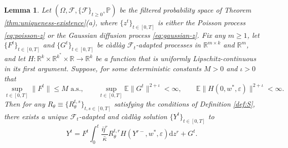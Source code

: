 \documentclass[11pt,letterpaper,reqno]{amsart}
\newtheorem{lem}[thm]{Lemma}
\theoremstyle{definition}
\def\eps{\varepsilon}
\def\d{\mathrm{d}}
\def\P{\mathbb{P}}
\def\E{\mathbb{E}}
\def\R{\mathbb{R}}
\def\cF{\mathcal{F}}
\def\Rt{R_\theta}
\newcommand{\norm}[1]{\|#1\|}
\begin{document}
\begin{lem}\label{lem:exist-unique-poisson-volterra}
Let $(\Omega,\cF,\{\cF\}_{t \geq 0},\P)$ be the filtered probability space
of Theorem \ref{thm:uniqueness-existence}(a), where
$\{z^t\}_{t \in [0,T]}$ is either the Poisson process
\eqref{eq:poisson-z} or the Gaussian diffusion process \eqref{eq:gaussian-z}.
Fix any $m \geq 1$, let $\{F^t\}_{t \in [0,T]}$ and $\{G^t\}_{t \in
[0,T]}$ be c\`adl\`ag $\cF_t$-adapted
processes in $\R^{m \times k}$ and $\R^m$, and let 
$H:\R^k \times \R^{k^*} \times \R \to \R^k$ be a function that is
uniformly Lipschitz-continuous in its first argument. Suppose,
for some deterministic constants $M>0$ and $\iota>0$ that
\[\sup_{t \in [0,T]} \norm{F^t} \leq M \text{ a.s.}, \qquad \sup_{t \in [0,T]} \E \norm{G^t}^{2+\iota}<\infty,
\qquad \E\|H(0,w^*,\eps)\|^{2+\iota}<\infty.\]
Then for any $\Rt \equiv \{\Rt^{t,s}\}_{t,s \in [0,T]}$
satisfying the conditions of Definition \ref{def:S},
there exists a unique $\cF_t$-adapted and c\`adl\`ag solution
$\{Y^t\}_{t \in [0,T]}$ to
\begin{equation}\label{eq:Picardconstruction}
Y^t=F^t \int_0^t \frac{\bar\eta^r}{\bar\kappa} R_\theta^{t,r}
H(Y^{r-},w^*,\eps)\d z^r+G^t.
\end{equation}
\end{lem}
\end{document}
